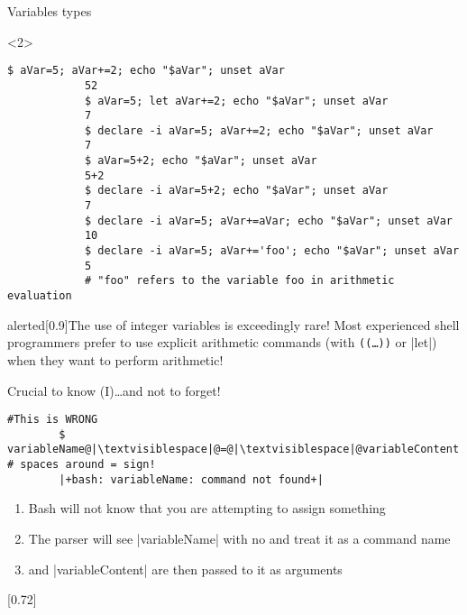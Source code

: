 \begin{frame}[fragile]{Variables types}
    \begin{onlyenv}<2>
        \begin{lstlisting}[style=MyBash, style=oddnumbers, belowskip=-5mm]
            $ aVar=5; aVar+=2; echo "$aVar"; unset aVar
            52
            $ aVar=5; let aVar+=2; echo "$aVar"; unset aVar
            7
            $ declare -i aVar=5; aVar+=2; echo "$aVar"; unset aVar
            7
            $ aVar=5+2; echo "$aVar"; unset aVar
            5+2
            $ declare -i aVar=5+2; echo "$aVar"; unset aVar
            7
            $ declare -i aVar=5; aVar+=aVar; echo "$aVar"; unset aVar
            10
            $ declare -i aVar=5; aVar+='foo'; echo "$aVar"; unset aVar
            5
            # "foo" refers to the variable foo in arithmetic evaluation
        \end{lstlisting}
        \begin{varblock}{alerted}[0.9\textwidth]{The use of integer variables is exceedingly rare!}
            Most experienced shell programmers prefer to use explicit arithmetic commands (with \texttt{((\ldots))} or \bash|let|) when they want to perform arithmetic!
        \end{varblock}
    \end{onlyenv}
\end{frame}
\begin{frame}[fragile]{Crucial to know (I)}{\ldots{}and not to forget!}
    \begin{lstlisting}[style=MyBash, numbers=none]
        #This is WRONG
        $ variableName@|\textvisiblespace|@=@|\textvisiblespace|@variableContent   # spaces around = sign!
        |+bash: variableName: command not found+|
    \end{lstlisting}
    \bigskip
    \begin{enumerate}
        \item Bash will not know that you are attempting to assign something
        \item The parser will see \bash|variableName| with no \bash{=} and treat it as a command name
        \item \bash{=} and \bash|variableContent| are then passed to it as arguments
    \end{enumerate}
    \bigskip
    \begin{varblock}{}[0.72\textwidth]{}
        \Large{}
    \end{varblock}
    
\end{frame}
